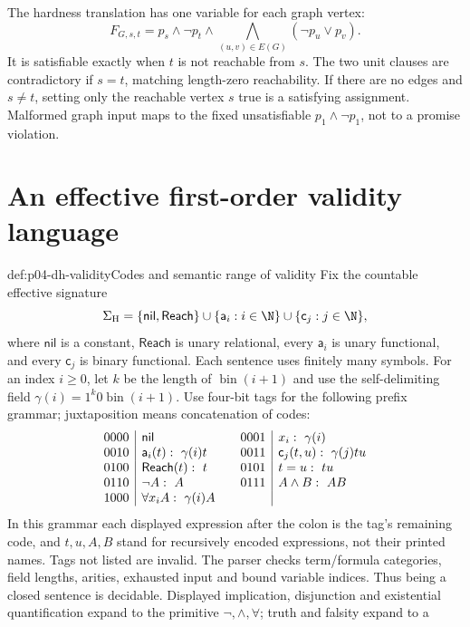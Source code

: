 The hardness translation has one variable for each graph vertex:
\[
 F_{G,s,t}
 =p_s\land\neg p_t\land
    \bigwedge_{(u,v)\in E(G)}(\neg p_u\lor p_v).
\]
It is satisfiable exactly when \(t\) is not reachable from \(s\).
The two unit clauses are contradictory if \(s=t\), matching length-zero
reachability. If there are no edges and \(s\ne t\), setting only the
reachable vertex \(s\) true is a satisfying assignment. Malformed graph
input maps to the fixed unsatisfiable \(p_1\land\neg p_1\), not to a
promise violation.

\section{An effective first-order validity language}
\label{sec:p04-dh-first-order}

\begin{hbdefinition}{def:p04-dh-validity}{Codes and semantic range of validity}
Fix the countable effective signature
\[
 \Sigma_{\mathrm H}
 =\{\mathsf{nil},\mathsf{Reach}\}
   \cup\{\mathsf a_i:i\in\N\}
   \cup\{\mathsf c_j:j\in\N\},
\]
where \(\mathsf{nil}\) is a constant, \(\mathsf{Reach}\) is unary
relational, every \(\mathsf a_i\) is unary functional, and every
\(\mathsf c_j\) is binary functional. Each sentence uses finitely many
symbols. For an index \(i\geq0\), let \(k\) be the length of
\(\operatorname{bin}(i+1)\) and use the self-delimiting field
\(\gamma(i)=1^k0\operatorname{bin}(i+1)\).
Use four-bit tags for the following prefix grammar; juxtaposition means
concatenation of codes:
\[
\begin{array}{c|l@{\qquad}c|l}
0000&\mathsf{nil}&0001&x_i:\ \gamma(i)\\
0010&\mathsf a_i(t):\ \gamma(i)t&0011&\mathsf c_j(t,u):\ \gamma(j)tu\\
0100&\mathsf{Reach}(t):\ t&0101&t=u:\ tu\\
0110&\neg A:\ A&0111&A\land B:\ AB\\
1000&\forall x_i A:\ \gamma(i)A&&
\end{array}
\]
In this grammar each displayed expression after the colon is the tag's
remaining code, and \(t,u,A,B\) stand for recursively encoded expressions,
not their printed names. Tags not listed are invalid. The parser checks
term/formula categories, field lengths, arities, exhausted input and bound
variable indices. Thus being a closed sentence is decidable.
Displayed implication, disjunction and existential quantification expand
to the primitive \(\neg,\land,\forall\); truth and falsity expand to a

\end{hbdefinition}
